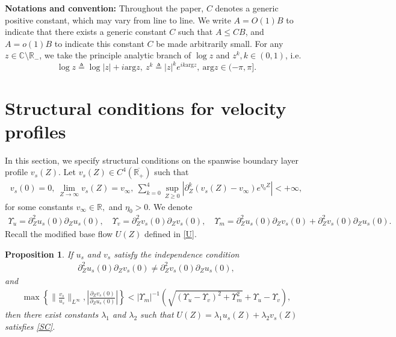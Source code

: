 \documentclass[reqno,11pt]{amsart}
\numberwithin{equation}{section}
\numberwithin{equation}{section}
\theoremstyle{plain}
\newtheorem{proposition}[theorem]{Proposition}
\begin{document}
{\bf Notations and convention:} Throughout the paper,  $C$ denotes a generic positive constant, which may vary from line to line.  We write $A=O(1)B$ to indicate that there exists a generic constant $C$ such that $A\leq CB$, and $A=o(1)B$ to indicate this constant $C$ be made arbitrarily small. For any $z\in \mathbb{C}\setminus \mathbb{R}_-$,  we take the principle analytic branch of $\log z$ and $z^k, k\in (0,1)$, i.e.
$$\log z\triangleq \log|z|+i\text{arg}z,~ z^k\triangleq|z|^ke^{ik \text{arg} z},~\text{arg}z\in (-\pi,\pi].$$
\section{Structural conditions for velocity profiles}\label{sec2}

In this section, we specify structural conditions on the spanwise boundary layer profile $v_s(Z)$. Let $v_s(Z)\in C^4(\overline{\mathbb{R}_+})$ such that
	\begin{align}
			v_s(0)=0,~ \lim\limits_{Z\to\infty}v_s(Z)=v_\infty, ~ \sum_{k=0}^{4}\sup_{Z\geq0}\left|\partial_Z^k(v_s(Z)-v_{\infty})e^{\eta_0 Z}\right|<+\infty,\nonumber
	\end{align}
for some constants $v_\infty\in \mathbb{R},$ and  $\eta_0>0$. We denote
	\begin{align*}
	\Upsilon_u=\partial_Z^2u_s(0)\partial_Zu_s(0),\quad \Upsilon_v=\partial_Z^2v_s(0)\partial_Zv_s(0),\quad \Upsilon_m=\partial_Z^2u_s(0)\partial_Zv_s(0)+\partial_Z^2v_s(0)\partial_Zu_s(0).
	\end{align*}
Recall the modified base flow $U(Z)$ defined in \eqref{U}.
\begin{proposition}\label{pSC}
	If $u_s$ and $v_s$ satisfy the independence condition 
	\begin{align}
		\partial_Z^2u_s(0)\partial_Zv_s(0)\neq \partial_Z^2v_s(0)\partial_Zu_s(0),\label{np}
	\end{align}
	 and 
	\begin{align}
	 \max\left\{\|\frac{v_s}{u_s}\|_{L^\infty},|\frac{\partial_Zv_s(0)}{\partial_Zu_s(0)}|\right\}< |\Upsilon_m|^{-1}\left(\sqrt{(\Upsilon_u-\Upsilon_v)^2+\Upsilon_m^2}+\Upsilon_u-\Upsilon_v\right),\label{s}
	\end{align}
then there exist constants $\lambda_1$ and $\lambda_2$ such that $U(Z)=\lambda_1 u_s(Z)+\lambda_2v_s(Z)$ satisfies  \eqref{SC}.
\end{proposition}
\end{document}

